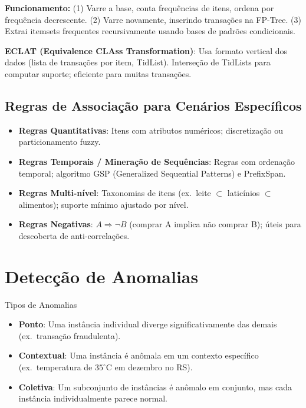 \documentclass[12pt,a4paper]{article}
\begin{document}
\textbf{Funcionamento:} (1) Varre a base, conta frequências de itens, ordena por frequência decrescente. (2) Varre novamente, inserindo transações na FP-Tree. (3) Extrai itemsets frequentes recursivamente usando bases de padrões condicionais.

\textbf{ECLAT (Equivalence CLAss Transformation)}: Usa formato vertical dos dados (lista de transações por item, TidList). Interseção de TidLists para computar suporte; eficiente para muitas transações.

\subsection{Regras de Associação para Cenários Específicos}

\begin{itemize}
  \item \textbf{Regras Quantitativas}: Itens com atributos numéricos; discretização ou particionamento fuzzy.
  \item \textbf{Regras Temporais / Mineração de Sequências}: Regras com ordenação temporal; algoritmo GSP (Generalized Sequential Patterns) e PrefixSpan.
  \item \textbf{Regras Multi-nível}: Taxonomias de itens (ex.\ leite $\subset$ laticínios $\subset$ alimentos); suporte mínimo ajustado por nível.
  \item \textbf{Regras Negativas}: $A \Rightarrow \neg B$ (comprar A implica não comprar B); úteis para descoberta de anti-correlações.
\end{itemize}

\section{Detecção de Anomalias}

\begin{definicaobox}{Tipos de Anomalias}
\begin{itemize}
  \item \textbf{Ponto}: Uma instância individual diverge significativamente das demais (ex.\ transação fraudulenta).
  \item \textbf{Contextual}: Uma instância é anômala em um contexto específico (ex.\ temperatura de $35^\circ$C em dezembro no RS).
  \item \textbf{Coletiva}: Um subconjunto de instâncias é anômalo em conjunto, mas cada instância individualmente parece normal.
\end{itemize}
\end{definicaobox}
\end{document}
